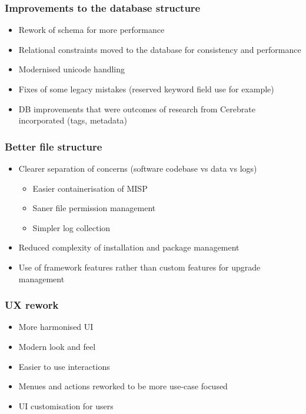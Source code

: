\begin{frame}
  \frametitle{Improvements to the database structure}
  \begin{itemize}
     \item Rework of schema for more performance
     \item Relational constraints moved to the database for consistency and performance
     \item Modernised unicode handling
     \item Fixes of some legacy mistakes (reserved keyword field use for example)
     \item DB improvements that were outcomes of research from Cerebrate incorporated (tags, metadata)
  \end{itemize}
\end{frame}

\begin{frame}
  \frametitle{Better file structure}
  \begin{itemize}
     \item Clearer separation of concerns (software codebase vs data vs logs)
     \begin{itemize}
         \item Easier containerisation of MISP
         \item Saner file permission management
         \item Simpler log collection
     \end{itemize}
     \item Reduced complexity of installation and package management
     \item Use of framework features rather than custom features for upgrade management
  \end{itemize}
\end{frame}

\begin{frame}
  \frametitle{UX rework}
  \begin{itemize}
     \item More harmonised UI
     \item Modern look and feel
     \item Easier to use interactions
     \item Menues and actions reworked to be more use-case focused
     \item UI customisation for users
  \end{itemize}
\end{frame}

